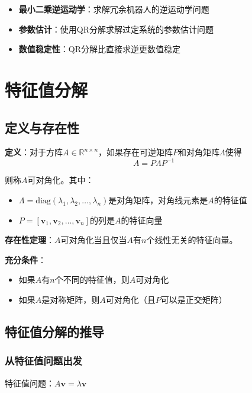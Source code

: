 \documentclass[12pt,a4paper]{article}
\begin{document}
\begin{itemize}
\item \textbf{最小二乘逆运动学}：求解冗余机器人的逆运动学问题
\item \textbf{参数估计}：使用QR分解求解过定系统的参数估计问题
\item \textbf{数值稳定性}：QR分解比直接求逆更数值稳定
\end{itemize}

\section{特征值分解}

\subsection{定义与存在性}

\textbf{定义}：对于方阵$A \in \mathbb{R}^{n \times n}$，如果存在可逆矩阵$P$和对角矩阵$\Lambda$使得
\begin{equation}
A = P \Lambda P^{-1}
\label{eq:eigen_decomp}
\end{equation}

则称$A$可对角化。其中：
\begin{itemize}
\item $\Lambda = \text{diag}(\lambda_1, \lambda_2, \ldots, \lambda_n)$是对角矩阵，对角线元素是$A$的特征值
\item $P = [\bm{v}_1, \bm{v}_2, \ldots, \bm{v}_n]$的列是$A$的特征向量
\end{itemize}

\textbf{存在性定理}：$A$可对角化当且仅当$A$有$n$个线性无关的特征向量。

\textbf{充分条件}：
\begin{itemize}
\item 如果$A$有$n$个不同的特征值，则$A$可对角化
\item 如果$A$是对称矩阵，则$A$可对角化（且$P$可以是正交矩阵）
\end{itemize}

\subsection{特征值分解的推导}

\subsubsection{从特征值问题出发}

特征值问题：$A\bm{v} = \lambda \bm{v}$
\end{document}
